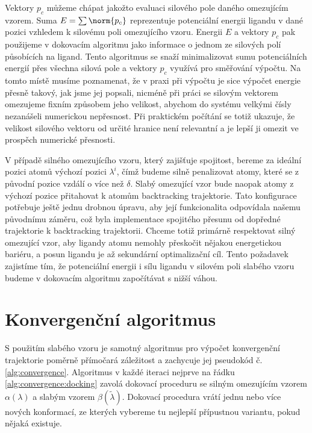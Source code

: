 Vektory $ p_c $ můžeme chápat jakožto evaluaci silového pole daného omezujícím
vzorem. Suma $ E = \sum \norm{p_c} $ reprezentuje potenciální energii
ligandu v dané pozici vzhledem k silovému poli omezujícího vzoru. Energii $ E $
a vektory $ p_c $ pak použijeme v dokovacím algoritmu jako informace o jednom
ze silových polí působících na ligand. Tento algoritmus se snaží minimalizovat sumu
potenciálních energií přes všechna silová pole a vektory $ p_c $ využívá pro
směřování výpočtu. Na tomto místě musíme poznamenat, že v praxi při výpočtu
je sice výpočet energie přesně takový, jak jsme jej popsali, nicméně při práci
se silovým vektorem omezujeme fixním způsobem jeho velikost, abychom do systému
velkými čísly nezanášeli numerickou nepřesnost. Při praktickém počítání se totiž
ukazuje, že velikost silového vektoru od určité hranice není relevantní a
je lepší ji omezit ve prospěch numerické přesnosti.


V případě silného omezujícího vzoru, který zajišťuje spojitost, bereme za
ideální pozici atomů výchozí pozici $ \lambda^i $, čímž budeme silně penalizovat atomy, které se
z původní pozice vzdálí o více než $ \delta $. Slabý omezující vzor bude naopak
atomy z výchozí pozice přitahovat k atomům backtracking trajektorie. Tato konfigurace
potřebuje ještě jednu drobnou úpravu, aby její funkcionalita odpovídala našemu
původnímu záměru, což byla implementace spojitého přesunu od dopředné trajektorie
k backtracking trajektorii. Chceme totiž primárně respektovat silný omezující
vzor, aby ligandy atomu nemohly přeskočit nějakou energetickou bariéru, a posun
ligandu je až sekundární optimalizační cíl. Tento požadavek zajistíme tím, že
potenciální energii i sílu ligandu v silovém poli slabého vzoru budeme v dokovacím
algoritmu započítávat s nižší váhou.





\section{Konvergenční algoritmus} \label{subsec:convergence_algorithm}
S použitím slabého vzoru je samotný algoritmus pro výpočet konvergenční
trajektorie poměrně přímočará záležitost a zachycuje jej pseudokód č.
\ref{alg:convergence}. Algoritmus v každé iteraci nejprve na řádku
\ref{alg:convergence:docking} zavolá dokovací proceduru se silným omezujícím
vzorem $ \alpha(\lambda) $ a slabým vzorem $ \beta(\tilde{\lambda})$. Dokovací
procedura vrátí jednu nebo více nových konformací, ze kterých vybereme
tu nejlepší přípustnou variantu, pokud nějaká existuje.

